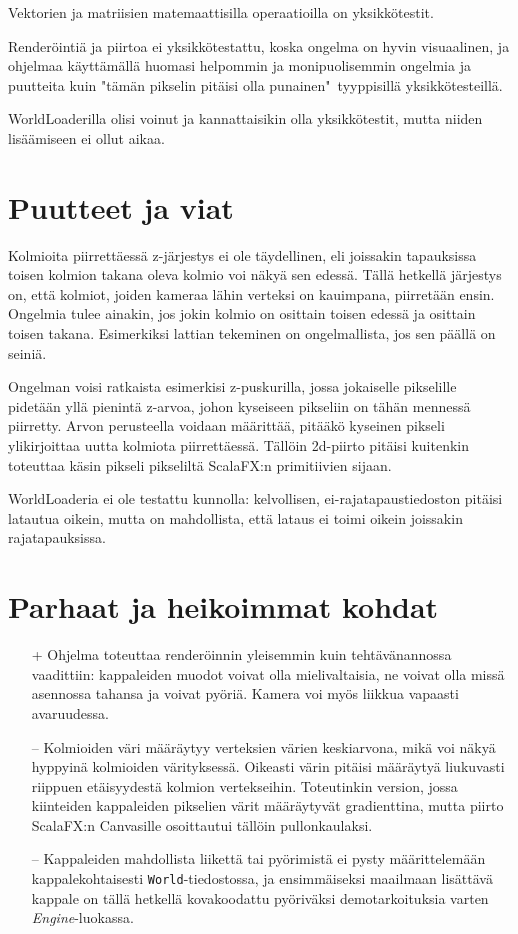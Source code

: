 \documentclass[12pt] {article}
\begin{document}
Vektorien ja matriisien matemaattisilla operaatioilla on yksikkötestit.

Renderöintiä ja piirtoa ei yksikkötestattu, koska ongelma on hyvin visuaalinen, ja ohjelmaa käyttämällä huomasi helpommin ja monipuolisemmin ongelmia ja puutteita kuin "tämän pikselin pitäisi olla punainen"\ tyyppisillä yksikkötesteillä.

WorldLoaderilla olisi voinut ja kannattaisikin olla yksikkötestit, mutta niiden lisäämiseen ei ollut aikaa.

\section {Puutteet ja viat}

Kolmioita piirrettäessä z-järjestys ei ole täydellinen, eli joissakin tapauksissa toisen kolmion takana oleva kolmio voi näkyä sen edessä. Tällä hetkellä järjestys on, että kolmiot, joiden kameraa lähin verteksi on kauimpana, piirretään ensin. Ongelmia tulee ainakin, jos jokin kolmio on osittain toisen edessä ja osittain toisen takana. Esimerkiksi lattian tekeminen on ongelmallista, jos sen päällä on seiniä.

Ongelman voisi ratkaista esimerkisi z-puskurilla, jossa jokaiselle pikselille pidetään yllä pienintä z-arvoa, johon kyseiseen pikseliin on tähän mennessä piirretty. Arvon perusteella voidaan määrittää, pitääkö kyseinen pikseli ylikirjoittaa uutta kolmiota piirrettäessä. Tällöin 2d-piirto pitäisi kuitenkin toteuttaa käsin pikseli pikseliltä ScalaFX:n primitiivien sijaan.

WorldLoaderia ei ole testattu kunnolla: kelvollisen, ei-rajatapaustiedoston pitäisi latautua oikein, mutta on mahdollista, että lataus ei toimi oikein joissakin rajatapauksissa.

\section {Parhaat ja heikoimmat kohdat}

\begin{itemize}
	\item[+] Ohjelma toteuttaa renderöinnin yleisemmin kuin tehtävänannossa vaadittiin: kappaleiden muodot voivat olla mielivaltaisia, ne voivat olla missä asennossa tahansa ja voivat pyöriä. Kamera voi myös liikkua vapaasti avaruudessa.
	\item[--] Kolmioiden väri määräytyy verteksien värien keskiarvona, mikä voi näkyä hyppyinä kolmioiden värityksessä. Oikeasti värin pitäisi määräytyä liukuvasti riippuen etäisyydestä kolmion vertekseihin. Toteutinkin version, jossa kiinteiden kappaleiden pikselien värit määräytyvät gradienttina, mutta piirto ScalaFX:n Canvasille osoittautui tällöin pullonkaulaksi.
	\item[--] Kappaleiden mahdollista liikettä tai pyörimistä ei pysty määrittelemään kappalekohtaisesti \texttt{World}-tiedostossa, ja ensimmäiseksi maailmaan lisättävä kappale on tällä hetkellä kovakoodattu pyöriväksi demotarkoituksia varten \textit{Engine}-luokassa.
\end{itemize}
\end{document}
